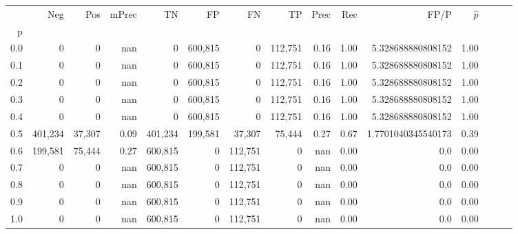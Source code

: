 \begin{tabular}{rrrrrrrrrrrrrrr}
\toprule
{} &      Neg &     Pos & mPrec &       TN &       FP &       FN &       TP &  Prec &   Rec &                FP/P & $\hat{p}$ \\
p   &          &         &       &          &          &          &          &       &       &                     &           \\
\midrule
0.0 &        0 &       0 &   nan &        0 &  600,815 &        0 &  112,751 &  0.16 &  1.00 &   5.328688880808152 &      1.00 \\
0.1 &        0 &       0 &   nan &        0 &  600,815 &        0 &  112,751 &  0.16 &  1.00 &   5.328688880808152 &      1.00 \\
0.2 &        0 &       0 &   nan &        0 &  600,815 &        0 &  112,751 &  0.16 &  1.00 &   5.328688880808152 &      1.00 \\
0.3 &        0 &       0 &   nan &        0 &  600,815 &        0 &  112,751 &  0.16 &  1.00 &   5.328688880808152 &      1.00 \\
0.4 &        0 &       0 &   nan &        0 &  600,815 &        0 &  112,751 &  0.16 &  1.00 &   5.328688880808152 &      1.00 \\
0.5 &  401,234 &  37,307 &  0.09 &  401,234 &  199,581 &   37,307 &   75,444 &  0.27 &  0.67 &  1.7701040345540173 &      0.39 \\
0.6 &  199,581 &  75,444 &  0.27 &  600,815 &        0 &  112,751 &        0 &   nan &  0.00 &                 0.0 &      0.00 \\
0.7 &        0 &       0 &   nan &  600,815 &        0 &  112,751 &        0 &   nan &  0.00 &                 0.0 &      0.00 \\
0.8 &        0 &       0 &   nan &  600,815 &        0 &  112,751 &        0 &   nan &  0.00 &                 0.0 &      0.00 \\
0.9 &        0 &       0 &   nan &  600,815 &        0 &  112,751 &        0 &   nan &  0.00 &                 0.0 &      0.00 \\
1.0 &        0 &       0 &   nan &  600,815 &        0 &  112,751 &        0 &   nan &  0.00 &                 0.0 &      0.00 \\
\bottomrule
\end{tabular}
